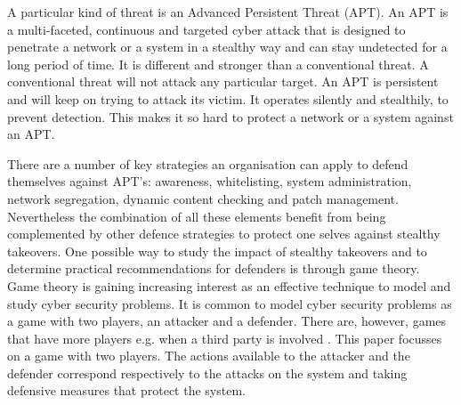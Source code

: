 A particular kind of threat is an Advanced Persistent Threat (APT). An APT is a multi-faceted, continuous and targeted cyber attack that is designed to penetrate a network or a system in a stealthy way and can stay undetected for a long period of time. It is different and stronger than a conventional threat. A conventional threat will not attack any particular target. An APT is persistent and will keep on trying to attack its victim. It operates silently and stealthily, to prevent detection. This makes it so hard to protect a network or a system against an APT. 



There are a number of key strategies an organisation can apply to defend themselves against APT's: awareness, whitelisting, system administration, network segregation, dynamic content checking and patch management. Nevertheless the combination of all these elements benefit from being complemented by other defence strategies to protect one selves against stealthy takeovers. One possible way to study the impact of stealthy takeovers and to determine practical recommendations for defenders is through game theory.\\
Game theory is gaining increasing interest as an effective technique to model and study cyber security problems. It is common to model cyber security problems as a game with two players, an attacker and a defender. There are, however, games that have more players e.g. when a third party is involved \cite{fengstealthy}. This paper focusses on a game with two players. The actions available to the attacker and the defender correspond respectively to the attacks on the system and taking defensive measures that protect the system. \\

